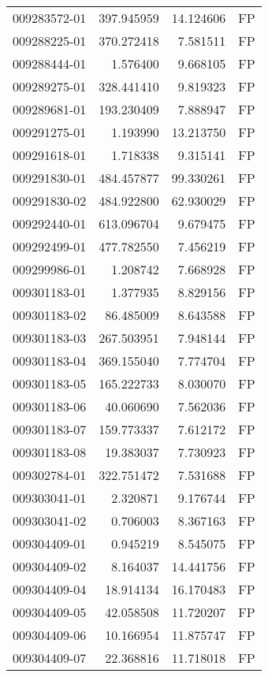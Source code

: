 \begin{tabular}{lrrl}
009283572-01 &  397.945959 &    14.124606 &   FP \\
009288225-01 &  370.272418 &     7.581511 &   FP \\
009288444-01 &    1.576400 &     9.668105 &   FP \\
009289275-01 &  328.441410 &     9.819323 &   FP \\
009289681-01 &  193.230409 &     7.888947 &   FP \\
009291275-01 &    1.193990 &    13.213750 &   FP \\
009291618-01 &    1.718338 &     9.315141 &   FP \\
009291830-01 &  484.457877 &    99.330261 &   FP \\
009291830-02 &  484.922800 &    62.930029 &   FP \\
009292440-01 &  613.096704 &     9.679475 &   FP \\
009292499-01 &  477.782550 &     7.456219 &   FP \\
009299986-01 &    1.208742 &     7.668928 &   FP \\
009301183-01 &    1.377935 &     8.829156 &   FP \\
009301183-02 &   86.485009 &     8.643588 &   FP \\
009301183-03 &  267.503951 &     7.948144 &   FP \\
009301183-04 &  369.155040 &     7.774704 &   FP \\
009301183-05 &  165.222733 &     8.030070 &   FP \\
009301183-06 &   40.060690 &     7.562036 &   FP \\
009301183-07 &  159.773337 &     7.612172 &   FP \\
009301183-08 &   19.383037 &     7.730923 &   FP \\
009302784-01 &  322.751472 &     7.531688 &   FP \\
009303041-01 &    2.320871 &     9.176744 &   FP \\
009303041-02 &    0.706003 &     8.367163 &   FP \\
009304409-01 &    0.945219 &     8.545075 &   FP \\
009304409-02 &    8.164037 &    14.441756 &   FP \\
009304409-04 &   18.914134 &    16.170483 &   FP \\
009304409-05 &   42.058508 &    11.720207 &   FP \\
009304409-06 &   10.166954 &    11.875747 &   FP \\
009304409-07 &   22.368816 &    11.718018 &   FP \\

\end{tabular}
